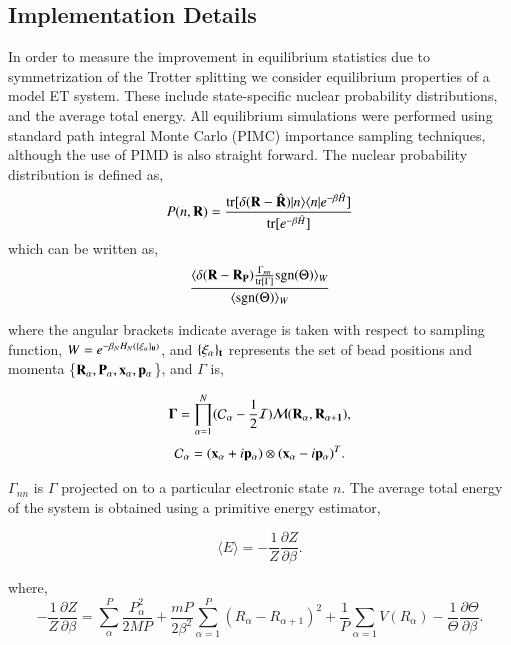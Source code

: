 \documentclass[phd,tocprelim]{cornell}
\begin{document}
\subsection{Implementation Details}
In order to measure the improvement in equilibrium statistics due to symmetrization of the Trotter splitting we consider equilibrium properties of a model ET system. These include state-specific nuclear probability distributions, and the average total energy. All equilibrium simulations were performed using standard path integral Monte Carlo (PIMC) importance sampling techniques, although the use of PIMD is also straight forward. 
The nuclear probability distribution is defined as,
\begin{equation}
P(n, {\bf{R}})=\frac{\textrm{tr}[\delta({\bf{R}}-{\hat{\bf{R}}})|n\rangle \langle n| e^{-\beta \hat{H}}]}{\textrm{tr}[ e^{-\beta \hat{H}}]}
\end{equation}
which can be written as, 
\begin{equation}
\frac{\langle  \delta({\bf{R}}-{\bf{R_P}}) \frac{\Gamma_{nn}}{\textrm{tr}[\Gamma]} \textrm{sgn}(\Theta)\rangle_W}{\langle \textrm{sgn}(\Theta) \rangle_W}
\end{equation}

where the angular brackets indicate average is taken with respect to sampling function, $W = e^{-\beta_{{N}} H_{N}(\{\bf{\xi}_\alpha\}_0)}$, 
and $\{\bf{\xi}_\alpha\}_t$ represents the set of bead positions and momenta \{$\bf{R}_{\alpha},\bf{P}_{\alpha},\bf{x}_{\alpha},\bf{p}_{\alpha}$\}, and $\Gamma$ is, 

\begin{equation} \label{eq:gamma} {\bf{\Gamma}}
= \prod_{\alpha=1}^{N} (
\mathcal{C}_{\alpha} - \frac{1}{2}
\mathcal{I})
\mathcal{M}(\bf{R}_{\alpha},{\bf R}_{\alpha+1}),
\end{equation}
\begin{equation} \label{eq:cmat}
\mathcal{C}_{\alpha} = ({\bf{x}}_{\alpha}
+ i{\bf{p}}_{\alpha}) \otimes
({\bf{x}}_{\alpha} - i{\bf{p}}_{\alpha})^T.
\end{equation}

 $\Gamma_{nn}$ is $\Gamma$ projected on to a particular electronic state $n$. The average total energy of the system is obtained using a primitive energy estimator,

\begin{equation} 
\langle E \rangle = - \frac{1}{Z} \frac{\partial Z}{\partial \beta}.
\end{equation}

where, 
\begin{equation} 
-\frac{1}{Z} \frac{\partial Z}{\partial \beta}= \sum_{\alpha}^{P} \frac{P_{\alpha}^2}{2MP} +\frac{mP}{2\beta^2} \sum_{\alpha=1}^P ( R_{\alpha}-R_{\alpha+1})^2 +\frac{1}{P}\sum_{\alpha=1} V(R_{\alpha}) -\frac{1}{\Theta}\frac{\partial \Theta}{\partial \beta}.
\end{equation}
\end{document}
